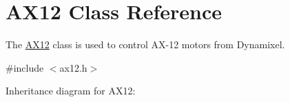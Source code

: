 \hypertarget{class_a_x12}{}\section{A\+X12 Class Reference}
\label{class_a_x12}


The \hyperlink{class_a_x12}{A\+X12} class is used to control A\+X-\/12 motors from Dynamixel.  




{\ttfamily \#include $<$ax12.\+h$>$}



Inheritance diagram for A\+X12\+:

